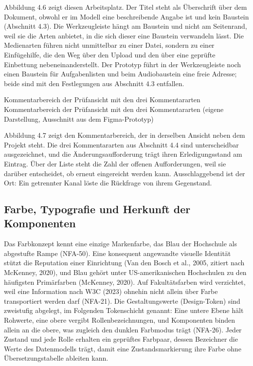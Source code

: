 Abbildung 4.6 zeigt diesen Arbeitsplatz. Der Titel steht als Überschrift über dem Dokument, obwohl er im Modell eine beschreibende Angabe ist und kein Baustein (Abschnitt 4.3). Die Werkzeugleiste hängt am Baustein und nicht am Seitenrand, weil sie die Arten anbietet, in die sich dieser eine Baustein verwandeln lässt. Die Medienarten führen nicht unmittelbar zu einer Datei, sondern zu einer Einfügehilfe, die den Weg über den Upload und den über eine geprüfte Einbettung nebeneinanderstellt. Der Prototyp führt in der Werkzeugleiste noch einen Baustein für Aufgabenlisten und beim Audiobaustein eine freie Adresse; beide sind mit den Festlegungen aus Abschnitt 4.3 entfallen.

%
{Kommentarbereich der Prüfansicht mit den drei Kommentararten}%
{Kommentarbereich der Prüfansicht mit den drei Kommentararten (eigene Darstellung, Ausschnitt aus dem Figma-Prototyp)}

Abbildung 4.7 zeigt den Kommentarbereich, der in derselben Ansicht neben dem Projekt steht. Die drei Kommentararten aus Abschnitt 4.4 sind unterscheidbar ausgezeichnet, und die Änderungsaufforderung trägt ihren Erledigungsstand am Eintrag. Über der Liste steht die Zahl der offenen Aufforderungen, weil sie darüber entscheidet, ob erneut eingereicht werden kann. Ausschlaggebend ist der Ort: Ein getrennter Kanal löste die Rückfrage von ihrem Gegenstand.

\subsection{Farbe, Typografie und Herkunft der Komponenten}

Das Farbkonzept kennt eine einzige Markenfarbe, das Blau der Hochschule als abgestufte Rampe (NFA-50). Eine konsequent angewandte visuelle Identität stützt die Reputation einer Einrichtung (Van den Bosch et al., 2005, zitiert nach McKenney, 2020), und Blau gehört unter US-amerikanischen Hochschulen zu den häufigsten Primärfarben (McKenney, 2020). Auf Fakultätsfarben wird verzichtet, weil eine Information nach W3C (2023) ohnehin nicht allein über Farbe transportiert werden darf (NFA-21). Die Gestaltungswerte (Design-Token) sind zweistufig abgelegt, im Folgenden Tokenschicht genannt: Eine untere Ebene hält Rohwerte, eine obere vergibt Rollenbezeichnungen, und Komponenten binden allein an die obere, was zugleich den dunklen Farbmodus trägt (NFA-26). Jeder Zustand und jede Rolle erhalten ein geprüftes Farbpaar, dessen Bezeichner die Werte des Datenmodells trägt, damit eine Zustandsmarkierung ihre Farbe ohne Übersetzungstabelle ableiten kann.

